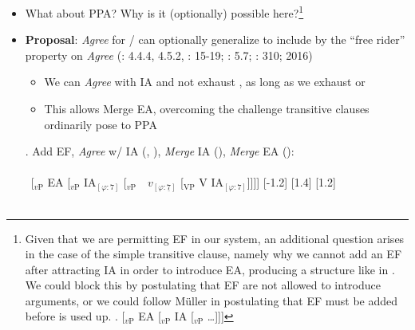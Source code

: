 \documentclass[letterpaper,10pt]{handout_nick}
\begin{document}
\begin{itemize}
\item What about PPA? Why is it (optionally) possible here?\footnote{Given that we are permitting EF in our system, an additional question arises in the case of the simple transitive clause, namely why we cannot add an EF after attracting IA in order to introduce EA, producing a structure like in \Next. We could block this by postulating that EF are not allowed to introduce arguments, or we could follow M\"uller in postulating that EF must be added before \fm{$\varphi$} is used up.
\ex. [$_\text{$v$P}$ EA [$_\text{$v$P}$ IA [$_\text{$v$P}$ \ldots]]]

}
\item {\bf Proposal}: \emph{Agree} for / can optionally generalize to include \fa{$\varphi$} by the ``free rider'' property on \emph{Agree} (\citealt{chomsky95}: 4.4.4, 4.5.2, \citeyear{chomsky01}: 15-19; \citealt{bruening01}: 5.7; \citealt{rezac13}: 310; \citeauthor{longenbaugh16} 2016) 
\begin{itemize}
\item We can \emph{Agree} with IA and not exhaust \fm{$\varphi$}, as long as we exhaust  or 
\item This allows Merge EA, overcoming the challenge transitive clauses ordinarily pose to PPA 
\end{itemize}
\ex. Add EF, \emph{Agree} w/ IA (, \fas{$\varphi$}), \emph{Merge} IA (), \emph{Merge} EA (\fms{$\varphi$}):\\\\
\ [$_\text{$v$P}$ \hspace*{-.3cm}EA [$_\text{$v$P}$ \hspace*{-.3cm}IA$_{[\varphi:7]}$ [$_\text{$v$P}$\ \ \hspace*{-.2cm}\hspace*{-.2cm}$v_{[\varphi:\underline{7}]}$ [$_\text{VP}$ V \hspace*{-.3cm}IA$_{[\varphi:7]}$]]]]
[-1.2]
[1.4]
[1.2]\\\\


\end{itemize}
\end{document}
